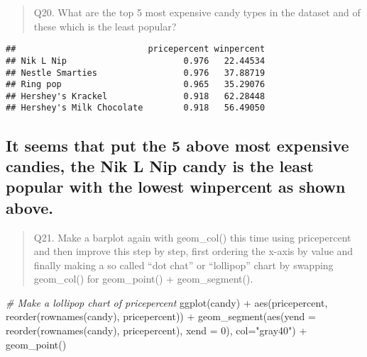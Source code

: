 \documentclass[
]{article}
\newenvironment{Shaded}{\begin{snugshade}}{\end{snugshade}}
\newcommand{\AttributeTok}[1]{\textcolor[rgb]{0.77,0.63,0.00}{#1}}
\newcommand{\CommentTok}[1]{\textcolor[rgb]{0.56,0.35,0.01}{\textit{#1}}}
\newcommand{\ConstantTok}[1]{\textcolor[rgb]{0.00,0.00,0.00}{#1}}
\newcommand{\DecValTok}[1]{\textcolor[rgb]{0.00,0.00,0.81}{#1}}
\newcommand{\FunctionTok}[1]{\textcolor[rgb]{0.00,0.00,0.00}{#1}}
\newcommand{\NormalTok}[1]{#1}
\newcommand{\OtherTok}[1]{\textcolor[rgb]{0.56,0.35,0.01}{#1}}
\newcommand{\SpecialCharTok}[1]{\textcolor[rgb]{0.00,0.00,0.00}{#1}}
\newcommand{\StringTok}[1]{\textcolor[rgb]{0.31,0.60,0.02}{#1}}
\begin{document}
\begin{quote}
Q20. What are the top 5 most expensive candy types in the dataset and of
these which is the least popular?
\end{quote}

\begin{Shaded}
\end{Shaded}

\begin{verbatim}
##                          pricepercent winpercent
## Nik L Nip                       0.976   22.44534
## Nestle Smarties                 0.976   37.88719
## Ring pop                        0.965   35.29076
## Hershey's Krackel               0.918   62.28448
## Hershey's Milk Chocolate        0.918   56.49050
\end{verbatim}

\hypertarget{it-seems-that-put-the-5-above-most-expensive-candies-the-nik-l-nip-candy-is-the-least-popular-with-the-lowest-winpercent-as-shown-above.}{%
\subsection{It seems that put the 5 above most expensive candies, the
Nik L Nip candy is the least popular with the lowest winpercent as shown
above.}\label{it-seems-that-put-the-5-above-most-expensive-candies-the-nik-l-nip-candy-is-the-least-popular-with-the-lowest-winpercent-as-shown-above.}}

\begin{quote}
Q21. Make a barplot again with geom\_col() this time using pricepercent
and then improve this step by step, first ordering the x-axis by value
and finally making a so called ``dot chat'' or ``lollipop'' chart by
swapping geom\_col() for geom\_point() + geom\_segment().
\end{quote}

\begin{Shaded}
\begin{Highlighting}[]
\CommentTok{\# Make a lollipop chart of pricepercent}
\FunctionTok{ggplot}\NormalTok{(candy) }\SpecialCharTok{+}
  \FunctionTok{aes}\NormalTok{(pricepercent, }\FunctionTok{reorder}\NormalTok{(}\FunctionTok{rownames}\NormalTok{(candy), pricepercent)) }\SpecialCharTok{+}
  \FunctionTok{geom\_segment}\NormalTok{(}\FunctionTok{aes}\NormalTok{(}\AttributeTok{yend =} \FunctionTok{reorder}\NormalTok{(}\FunctionTok{rownames}\NormalTok{(candy), pricepercent), }
                   \AttributeTok{xend =} \DecValTok{0}\NormalTok{), }\AttributeTok{col=}\StringTok{"gray40"}\NormalTok{) }\SpecialCharTok{+}
    \FunctionTok{geom\_point}\NormalTok{()}
\end{Highlighting}
\end{Shaded}
\end{document}
